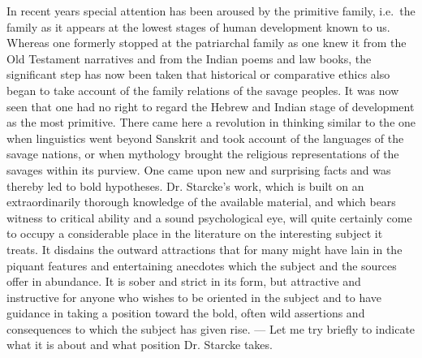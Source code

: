 \documentclass[12pt,a4paper,openany]{book}
\newcommand{\opage}[1]{\marginnote{\footnotesize\textit{[#1]}}}
\begin{document}
In recent years special attention has been aroused by the primitive
family, i.e.\ the family as it appears at the
\opage{788}lowest stages of human development known to us. Whereas
one formerly stopped at the patriarchal family as
one knew it from the Old Testament narratives and from
the Indian poems and law books, the significant step has now
been taken that historical or comparative ethics also began
to take account of the family relations of the savage peoples. It was
now seen that one had no right to regard the Hebrew and
Indian stage of development as the most primitive. There came here a
revolution in thinking similar to the one when linguistics went
beyond Sanskrit and took account of the languages of the savage nations,
or when mythology brought the religious representations of the savages within
its purview. One came upon new and surprising facts
and was thereby led to bold hypotheses. Dr. Starcke's
work, which is built on an extraordinarily thorough knowledge of the
available material, and which bears witness to critical ability
and a sound psychological eye, will quite certainly come to occupy
a considerable place in the literature on the interesting subject
it treats. It disdains the outward attractions that for many
might have lain in the piquant features and entertaining anecdotes
which the subject and the sources offer in abundance.
It is sober and strict in its form, but attractive and instructive
for anyone who wishes to be oriented in the subject and to have guidance in
taking a position toward the bold, often wild assertions and consequences
to which the subject has given rise. --- Let me try
briefly to indicate what it is about and what position
Dr. Starcke takes.
\end{document}
